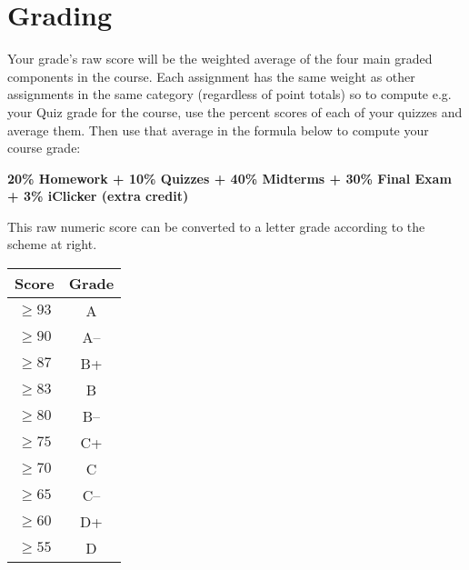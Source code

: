 \documentclass[11pt,letterpaper]{article}
\begin{document}
\section*{Grading}
\parbox[b]{5.25in}{%
  Your grade's raw score will be the weighted average of the four main
  graded components in the course. Each assignment has the same weight as other assignments in the same category (regardless of point totals) so to compute e.g. your Quiz grade for the course, use the percent scores of each of your quizzes and average them. Then use that average in the formula below to compute your course grade:
  \begin{center}
  {\bf
      20\% Homework %
    + 10\% Quizzes
    + 40\% Midterms
    + 30\% Final Exam \\
    + 3\% iClicker (extra credit)

  }
  \end{center}
  This raw numeric score can be converted to a letter
  grade according to the scheme at right.  %
  }\hfill
\parbox{1.4in}{%
  \vspace*{-2.1in}
  \begin{tabular}{cc}
    \toprule
    \textbf{Score} & \textbf{Grade} \\ \toprule
    $\ge 93$ & A \\
    $\ge 90$ & A--  \\ \midrule
    $\ge 87$ & B+ \\
    $\ge 83$ & B \\
    $\ge 80$ & B-- \\ \midrule
    $\ge 75$ & C+ \\
    $\ge 70$ & C \\
    $\ge 65$ & C-- \\ \midrule
    $\ge 60$ & D+  \\
    $\ge 55$ & D  \\
    \bottomrule
  \end{tabular}
}

\end{document}
